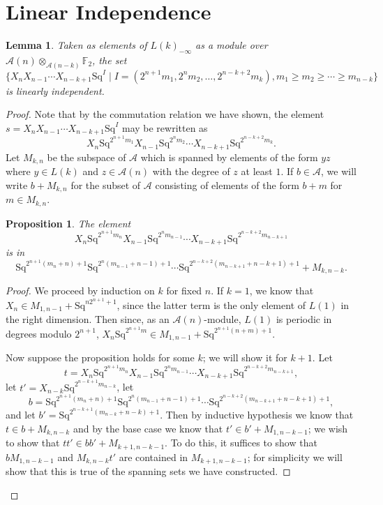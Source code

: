 \documentclass{article}
\newcommand{\A}{\mathcal{A}}
\newcommand{\F}{\mathbb{F}}
\newcommand{\Sq}{\mathrm{Sq}}
\newtheorem{prop}{Proposition}
\newtheorem{lem}{Lemma}
\begin{document}
  \section{Linear Independence}

  \begin{lem}\label{lem:linearly-independent}
    Taken as elements of $L(k)_{-\infty}$ as a module over $\A(n)\otimes_{\A(n-k)}\F_2$, the set
    \[\{X_nX_{n-1}\cdots X_{n-k+1}\Sq^I\mid I=(2^{n+1}m_1,2^nm_2,\ldots,2^{n-k+2}m_k), m_1\geq m_2\geq\cdots\geq m_{n-k}\}\]
    is linearly independent.
  \end{lem}
  \begin{proof}
    Note that by the commutation relation we have shown, the element $s=X_nX_{n-1}\cdots X_{n-k+1}\Sq^I$ may be rewritten as
    \[X_n\Sq^{2^{n+1}m_1}X_{n-1}\Sq^{2^nm_2}\cdots X_{n-k+1}\Sq^{2^{n-k+2}m_k}.\]
    Let $M_{k,n}$ be the subspace of $\A$ which is spanned by elements of the form $yz$ where $y\in L(k)$ and $z\in \A(n)$ with the degree of $z$ at least $1$.  If $b\in \A$, we will write $b+M_{k,n}$ for the subset of $\A$ consisting of elements of the form $b+m$ for $m\in M_{k,n}$.

    \begin{prop}\label{prop:m-thing}
      The element
      \[X_n\Sq^{2^{n+1}m_n}X_{n-1}\Sq^{2^nm_{n-1}}\cdots X_{n-k+1}\Sq^{2^{n-k+2}m_{n-k+1}}\]
      is in
      \[\Sq^{2^{n+1}(m_n+n)+1}\Sq^{2^n(m_{n-1}+n-1)+1}\cdots\Sq^{2^{n-k+2}(m_{n-k+1}+n-k+1)+1} + M_{k,n-k}.\]
    \end{prop}
    \begin{proof}

    We proceed by induction on $k$ for fixed $n$.  If $k=1$, we know that $X_n\in M_{1,n-1}+\Sq^{n2^{n+1}+1}$, since the latter term is the only element of $L(1)$ in the right dimension.  Then since, as an $\A(n)$-module, $L(1)$ is periodic in degrees modulo $2^{n+1}$, $X_n\Sq^{2^{n+1}m}\in M_{1,n-1}+\Sq^{2^{n+1}(n+m)+1}$.

    Now suppose the proposition holds for some $k$; we will show it for $k+1$.  Let 
    \[t=X_n\Sq^{2^{n+1}m_n}X_{n-1}\Sq^{2^nm_{n-1}}\cdots X_{n-k+1}\Sq^{2^{n-k+2}m_{n-k+1}},\]
    let $t'=X_{n-k}\Sq^{2^{n-k+1}m_{n-k}}$, let
    \[b=\Sq^{2^{n+1}(m_n+n)+1}\Sq^{2^n(m_{n-1}+n-1)+1}\cdots\Sq^{2^{n-k+2}(m_{n-k+1}+n-k+1)+1},\]
    and let $b'=\Sq^{2^{n-k+1}(m_{n-k}+n-k)+1}$.  Then by inductive hypothesis we know that $t\in b+M_{k,n-k}$ and by the base case we know that $t'\in b'+M_{1,n-k-1}$; we wish to show that $tt'\in bb'+M_{k+1,n-k-1}$.  To do this, it suffices to show that $bM_{1,n-k-1}$ and $M_{k,n-k}t'$ are contained in $M_{k+1,n-k-1}$; for simplicity we will show that this is true of the spanning sets we have constructed.
    

\end{proof}
\end{proof}
\end{document}
